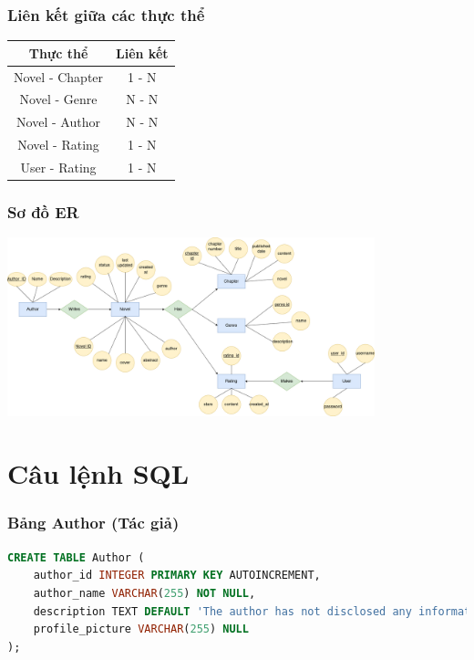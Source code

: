 \documentclass[12pt,aspectratio=169,handout]{beamer}
\begin{document}
\begin{frame}
	\frametitle{Liên kết giữa các thực thể}
	\begin{center}
		\begin{tabular}{|c|c|}
			\hline
			\textbf{Thực thể} & \textbf{Liên kết} \\
			\hline
			Novel - Chapter & 1 - N \\
			Novel - Genre & N - N \\
			Novel - Author & N - N \\
			Novel - Rating & 1 - N \\
			User - Rating & 1 - N \\
			\hline
		\end{tabular}
	\end{center}
\end{frame}


\begin{frame}
    \frametitle{Sơ đồ ER}
    \begin{center}
        \includegraphics[width=0.8\textwidth]{img/ER.png}
    \end{center}
\end{frame}

\section{Câu lệnh SQL}

\begin{frame}[fragile]
\frametitle{Bảng Author (Tác giả)}
\begin{lstlisting}[language=SQL, basicstyle=\small\ttfamily]
CREATE TABLE Author (
    author_id INTEGER PRIMARY KEY AUTOINCREMENT,
    author_name VARCHAR(255) NOT NULL,
    description TEXT DEFAULT 'The author has not disclosed any information about themselves.',
    profile_picture VARCHAR(255) NULL
);
\end{lstlisting}
\end{frame}
\end{document}
